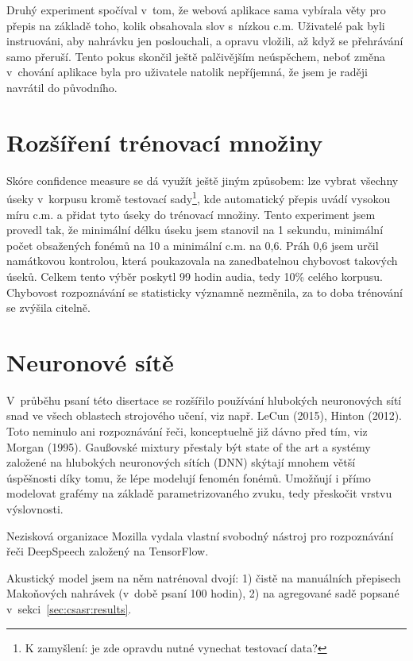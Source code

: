 Druhý experiment spočíval v~tom, že webová aplikace sama vybírala věty pro
přepis na základě toho, kolik obsahovala slov s~nízkou c.m. Uživatelé pak byli
instruováni, aby nahrávku jen poslouchali, a opravu vložili, až když se
přehrávání samo přeruší. Tento pokus skončil ještě palčivějším neúspěchem, neboť
změna v~chování aplikace byla pro uživatele natolik nepříjemná, že jsem je
raději navrátil do původního.

\section{Rozšíření trénovací množiny}
\label{sec:confident}

Skóre confidence measure se dá využít ještě jiným způsobem: lze vybrat všechny
úseky v~korpusu kromě testovací sady\footnote{K zamyšlení: je zde opravdu nutné
vynechat testovací data?}, kde automatický přepis uvádí vysokou míru
c.m. a přidat tyto úseky do trénovací množiny. Tento experiment jsem provedl
tak, že minimální délku úseku jsem stanovil na 1 sekundu, minimální počet
obsažených fonémů na 10 a minimální c.m. na 0,6. Práh 0,6 jsem určil namátkovou
kontrolou, která poukazovala na zanedbatelnou chybovost takových úseků. Celkem
tento výběr poskytl 99 hodin audia, tedy 10\% celého korpusu.
Chybovost rozpoznávání se statisticky významně nezměnila, za to doba trénování
se zvýšila citelně.

\section{Neuronové sítě}
\label{sec:deepspeech}

V~průběhu psaní této disertace se rozšířilo používání hlubokých neuronových sítí
snad ve všech oblastech strojového učení, viz např. LeCun
(2015)\cite{lecun2015deep}, Hinton (2012)\cite{hinton2012deep}. Toto neminulo ani
rozpoznávání řeči, konceptuelně již dávno před tím, viz Morgan
(1995)\cite{morgan1995neural}. Gaußovské mixtury
přestaly být state of the art a systémy založené na hlubokých neuronových sítích
(DNN) skýtají mnohem větší úspěšnosti díky tomu, že lépe modelují fenomén
fonémů. Umožňují i přímo modelovat grafémy na základě parametrizovaného zvuku, tedy
přeskočit vrstvu výslovnosti.

Nezisková organizace Mozilla vydala vlastní svobodný nástroj pro rozpoznávání
řeči DeepSpeech\cite{hannun2014deep} založený na
TensorFlow\cite{abadi2016tensorflow}.

Akustický model jsem na něm natrénoval dvojí: 1) čistě na manuálních přepisech
Makoňových nahrávek (v~době psaní 100 hodin), 2) na agregované sadě popsané
v~sekci~\ref{sec:csasr:results}.

